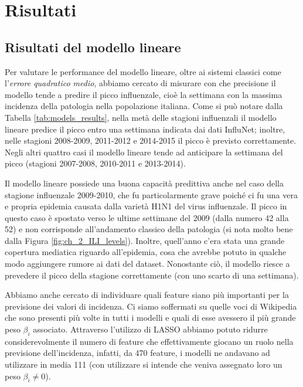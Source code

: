 \chapter{Risultati}
\bigskip

\section{Risultati del modello lineare}
\bigskip

Per valutare le performance del modello lineare, oltre ai sistemi classici come l'\textit{errore quadratico medio}, abbiamo 
cercato di misurare con che precisione il modello tende a predire il picco influenzale, cioè la settimana con la massima 
incidenza della patologia nella popolazione italiana. Come si può notare dalla Tabella \ref{tab:models_results}, nella metà 
delle stagioni influenzali il modello lineare predice il picco entro una settimana indicata dai dati InfluNet; inoltre, nelle 
stagioni 2008-2009, 2011-2012 e 2014-2015 il picco è previsto correttamente. Negli altri quattro casi il modello lineare 
tende ad anticipare la settimana del picco (stagioni 2007-2008, 2010-2011 e 2013-2014).
\bigskip

Il modello lineare possiede una buona capacità predittiva anche nel caso della stagione influenzale 2009-2010, che fu 
particolarmente grave poiché ci fu una vera e propria epidemia causata dalla varietà H1N1 del virus influenzale. Il picco in 
questo caso è spostato verso le ultime settimane del 2009 (dalla numero 42 alla 52) e non corrisponde all'andamento 
classico della patologia (si nota molto bene dalla Figura \ref{fig:ch_2_ILI_levels}). Inoltre, quell'anno c'era stata una 
grande copertura mediatica riguardo all'epidemia, cosa che avrebbe potuto in qualche modo aggiungere rumore ai dati del 
dataset. Nonostante ciò, il modello riesce a prevedere il picco della stagione correttamente (con uno scarto di una 
settimana).
\bigskip

Abbiamo anche cercato di individuare quali feature siano più importanti per la previsione dei valori di incidenza. Ci siamo 
soffermati su quelle voci di Wikipedia che sono presenti più volte in tutti i modelli e quali di esse avessero il più grande 
peso $\beta_i$ associato. Attraverso l'utilizzo di LASSO abbiamo potuto ridurre considerevolmente il numero di feature che 
effettivamente giocano un ruolo nella previsione dell'incidenza, infatti, da 470 feature, i modelli ne andavano 
ad utilizzare in media 111 (con utilizzare si intende che veniva assegnato loro un peso $\beta_i \neq 0$). 
\bigskip

